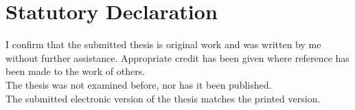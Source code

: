 \section{Statutory Declaration}

I confirm that the submitted thesis is original work and was written by me without further assistance. Appropriate credit has been given where reference has been made to the work of others.\\[.2cm]
The thesis was not examined before, nor has it been published.\\
The submitted electronic version of the thesis matches the printed version.\\[.5cm]

